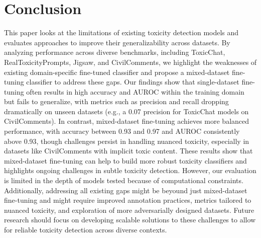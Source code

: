 \section{Conclusion}

This paper looks at the limitations of existing toxicity detection models and evaluates approaches to improve their generalizability across datasets. By analyzing performance across diverse benchmarks, including ToxicChat, RealToxicityPrompts, Jigsaw, and CivilComments, we highlight the weaknesses of existing domain-specific fine-tuned classifier and propose a mixed-dataset fine-tuning classifier to address these gaps.\newline
Our findings show that single-dataset fine-tuning often results in high accuracy and AUROC within the training domain but fails to generalize, with metrics such as precision and recall dropping dramatically on unseen datasets (e.g., a 0.07 precision for ToxicChat models on CivilComments). In contrast, mixed-dataset fine-tuning achieves more balanced performance, with accuracy between 0.93 and 0.97 and AUROC consistently above 0.93, though challenges persist in handling nuanced toxicity, especially in datasets like CivilComments with implicit toxic content.\newline
These results show that mixed-dataset fine-tuning can help to build more robust toxicity classifiers and highlights ongoing challenges in subtle toxicity detection. However, our evaluation is limited in the depth of models tested because of computational constraints. Additionally, addressing all existing gaps might be beyound just mixed-dataset fine-tuning and might require improved annotation practices, metrics tailored to nuanced toxicity, and exploration of more adversarially designed datasets. Future research should focus on developing scalable solutions to these challenges to allow for reliable toxicity detection across diverse contexts.